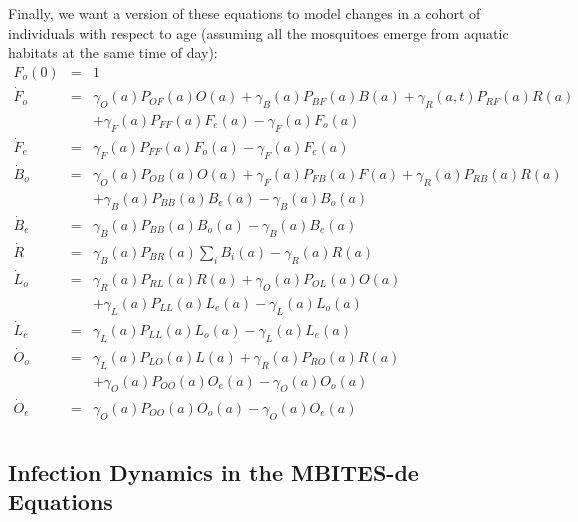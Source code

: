 \documentclass{article}
\begin{document}
Finally, we want a version of these equations to model changes in a cohort of individuals with respect to age (assuming all the mosquitoes emerge from aquatic habitats at the same time of day): 
\begin{equation}\begin{array}{rcl}
F_o(0) &=& 1 \\ 
%
{\dot F}_o&=& 
\gamma_O(a) P_{OF}(a) O(a) 
+ \gamma_B(a) P_{BF}(a) B(a) 
 + \gamma_R(a,t) P_{RF}(a) R(a)
\\ &&
+ \gamma_F(a) P_{FF}(a) F_e(a) 
- \gamma_F(a) F_o(a) \\ 
%
{\dot F}_e &=&  \gamma_F(a) P_{FF}(a) F_o (a) - \gamma_F(a) F_e(a) \\ 
%
%
{\dot B}_o &=&  \gamma_O(a) P_{OB}(a) O(a) + \gamma_F(a) P_{FB}(a) F(a) 
+ \gamma_R(a) P_{RB}(a) R(a) \\ && 
+ \gamma_B(a) P_{BB}(a) B_e(a)
- \gamma_B(a) B_o(a)\\
%
{\dot B}_e &=& \gamma_B(a) P_{BB}(a) B_o(a) -
\gamma_B(a) B_e(a) 
\\
%
{\dot R} &=&  \gamma_B(a) P_{BR}(a) \sum_i B_i(a) - \gamma_R(a) R(a)\\ 
%
{\dot L}_o&=& \gamma_R(a) P_{RL}(a) R(a) + 
\gamma_O(a) P_{OL}(a) O(a) \\&&
+ \gamma_L(a)  P_{LL}(a) L_e(a)
- \gamma_L(a) L_o(a)
\\ 
%
{\dot L}_e &=& \gamma_L(a) P_{LL}(a) L_o (a) - \gamma_L(a) L_e(a)
\\ 
%
{\dot O}_o &=& \gamma_L(a) P_{LO}(a) L(a) 
+ \gamma_R(a) P_{RO}(a) R(a)  
\\&& 
+ \gamma_O(a) P_{OO}(a) O_e(a)
- \gamma_O(a) O_o(a)
\\ 
%
{\dot O}_e &=& \gamma_O(a) P_{OO}(a) O_o (a) - \gamma_O(a) O_e(a)
\\ 
%
\end{array}\end{equation}

\subsection{Infection Dynamics in the MBITES-de Equations}
\end{document}
